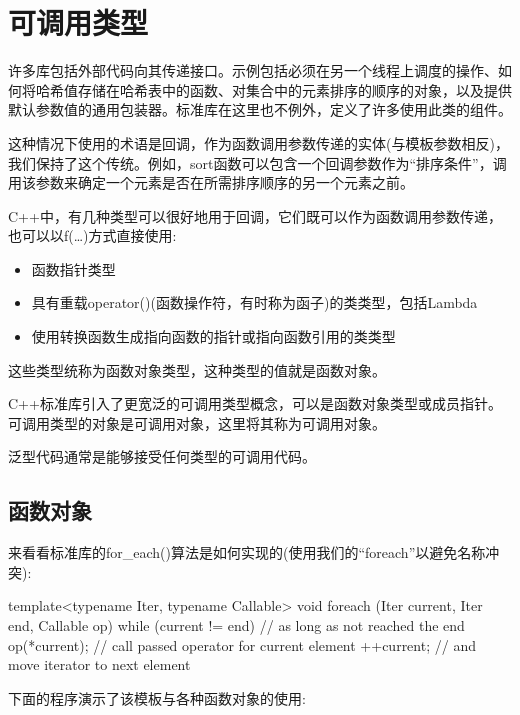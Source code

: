 \section{可调用类型}

许多库包括外部代码向其传递接口。示例包括必须在另一个线程上调度的操作、如何将哈希值存储在哈希表中的函数、对集合中的元素排序的顺序的对象，以及提供默认参数值的通用包装器。标准库在这里也不例外，定义了许多使用此类的组件。

这种情况下使用的术语是回调，作为函数调用参数传递的实体(与模板参数相反)，我们保持了这个传统。例如，sort函数可以包含一个回调参数作为“排序条件”，调用该参数来确定一个元素是否在所需排序顺序的另一个元素之前。

C++中，有几种类型可以很好地用于回调，它们既可以作为函数调用参数传递，也可以以f(…)方式直接使用:

\begin{itemize}
\item
函数指针类型

\item
具有重载operator()(函数操作符，有时称为函子)的类类型，包括Lambda

\item
使用转换函数生成指向函数的指针或指向函数引用的类类型
\end{itemize}

这些类型统称为函数对象类型，这种类型的值就是函数对象。

C++标准库引入了更宽泛的可调用类型概念，可以是函数对象类型或成员指针。可调用类型的对象是可调用对象，这里将其称为可调用对象。

泛型代码通常是能够接受任何类型的可调用代码。

\subsection{函数对象}

来看看标准库的for\_each()算法是如何实现的(使用我们的“foreach”以避免名称冲突):

\begin{cpp}
template<typename Iter, typename Callable>
void foreach (Iter current, Iter end, Callable op)
{
	while (current != end) { // as long as not reached the end
		op(*current); // call passed operator for current element
		++current; // and move iterator to next element
	}
}
\end{cpp}

下面的程序演示了该模板与各种函数对象的使用:

